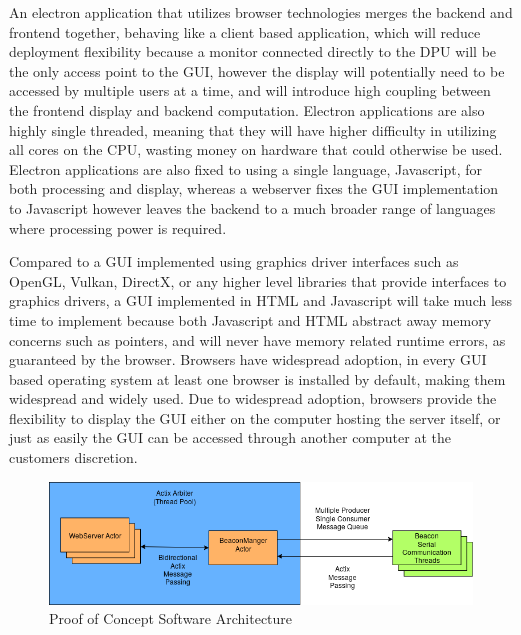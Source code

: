 \bigskip
An electron application that utilizes browser technologies merges the backend and frontend together, behaving like a client based application, which will reduce deployment flexibility because a monitor connected directly to the DPU will be the only access point to the GUI, however the display will potentially need to be accessed by multiple users at a time, and will introduce high coupling between the frontend display and backend computation.
Electron applications are also highly single threaded, meaning that they will have higher difficulty in utilizing all cores on the CPU, wasting money on hardware that could otherwise be used.
Electron applications are also fixed to using a single language, Javascript, for both processing and display, whereas a webserver fixes the GUI implementation to Javascript however leaves the backend to a much broader range of languages where processing power is required.

\pagebreak
Compared to a GUI implemented using graphics driver interfaces such as OpenGL, Vulkan, DirectX, or any higher level libraries that provide interfaces to graphics drivers, a GUI implemented in HTML and Javascript will take much less time to implement because both Javascript and HTML abstract away memory concerns such as pointers, and will never have memory related runtime errors, as guaranteed by the browser. Browsers have widespread adoption, in every GUI based operating system at least one browser is installed by default, making them widespread and widely used.
Due to widespread adoption, browsers provide the flexibility to display the GUI either on the computer hosting the server itself, or just as easily the GUI can be accessed through another computer at the customers discretion.

\bigskip
\begin{figure}[H]
	\centering
    \includegraphics[scale=0.6]{images/poc_arch.png}
    \caption{Proof of Concept Software Architecture}
    \label{software_poc_arch}
\end{figure}

